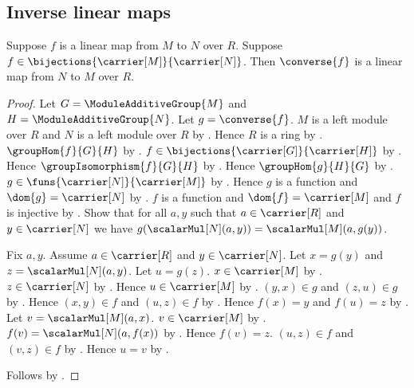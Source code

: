 \subsection{Inverse linear maps}

\begin{theorem}\label{bijective_linear_map_converse}
    Suppose $f$ is a linear map from $M$ to $N$ over $R$.
    Suppose $f\in\bijections{\carrier[M]}{\carrier[N]}$.
    Then $\converse{f}$ is a linear map from $N$ to $M$ over $R$.
\end{theorem}
\begin{proof}
    Let $G=\ModuleAdditiveGroup{M}$ and
        $H=\ModuleAdditiveGroup{N}$.
    Let $g=\converse{f}$.
    $M$ is a left module over $R$ and
        $N$ is a left module over $R$ by
        .
    Hence $R$ is a ring by .
    $\groupHom{f}{G}{H}$ by
        .
    $f\in\bijections{\carrier[G]}{\carrier[H]}$ by
        .
    Hence $\groupIsomorphism{f}{G}{H}$ by
        .
    Hence $\groupHom{g}{H}{G}$ by
        .
    $g\in\funs{\carrier[N]}{\carrier[M]}$ by
        .
    Hence $g$ is a function and $\dom{g}=\carrier[N]$ by
        .
    $f$ is a function and $\dom{f}=\carrier[M]$ and
        $f$ is injective by
        .
    Show that for all $a,y$ such that $a\in\carrier[R]$ and
        $y\in\carrier[N]$ we have
        $g(\scalarMul[N](a,y))=\scalarMul[M](a,g(y))$.
    \begin{subproof}
        Fix $a,y$.
        Assume $a\in\carrier[R]$ and $y\in\carrier[N]$.
        Let $x=g(y)$ and $z=\scalarMul[N](a,y)$.
        Let $u=g(z)$.
        $x\in\carrier[M]$ by .
        $z\in\carrier[N]$ by .
        Hence $u\in\carrier[M]$ by .
        $(y,x)\in g$ and $(z,u)\in g$ by
            .
        Hence $(x,y)\in f$ and $(u,z)\in f$ by
            .
        Hence $f(x)=y$ and $f(u)=z$ by
            .
        Let $v=\scalarMul[M](a,x)$.
        $v\in\carrier[M]$ by .
        $f(v)=\scalarMul[N](a,f(x))$ by
            .
        Hence $f(v)=z$.
        $(u,z)\in f$ and $(v,z)\in f$ by
            .
        Hence $u=v$ by .
    \end{subproof}
    Follows by .
\end{proof}

